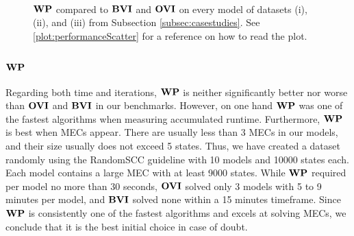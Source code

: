 \begin{figure}[h!]
    \centering
    \
    \caption{$\mathbf{WP}$ compared to $\mathbf{BVI}$ and $\mathbf{OVI}$ on every model of datasets (i), (ii), and (iii) from Subsection \ref{subsec:casestudies}. See \ref{plot:performanceScatter} for a reference on how to read the plot.}%
    \label{fig:WPvsBVIvsOVI}%
    \end{figure}
\FloatBarrier

\subsubsection*{\underline{$\mathbf{WP}$}}
Regarding both time and iterations, $\mathbf{WP}$ is neither significantly better nor worse than $\mathbf{OVI}$ and $\mathbf{BVI}$ in our benchmarks.
However, on one hand $\mathbf{WP}$ was one of the fastest algorithms when measuring accumulated runtime.
Furthermore, $\mathbf{WP}$ is best when MECs appear. There are usually less than 3 MECs in our models, and their size usually does not exceed 5 states.
Thus, we have created a dataset randomly using the RandomSCC guideline with 10 models and 10000 states each. Each model contains a large MEC with at least 9000 states.
While $\mathbf{WP}$ required per model no more than 30 seconds, $\mathbf{OVI}$ solved only 3 models with 5 to 9 minutes per model, and $\mathbf{BVI}$ solved none within a 15 minutes timeframe. 
Since $\mathbf{WP}$ is consistently one of the fastest algorithms and excels at solving MECs, we conclude that it is the best initial choice in case of doubt.

